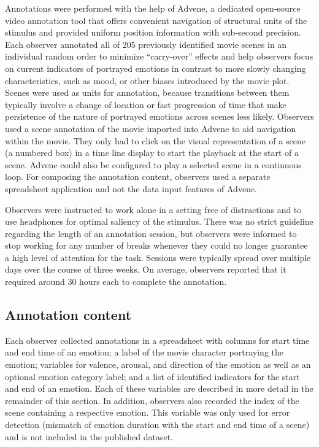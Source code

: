 \documentclass[10pt,a4paper,twocolumn]{article}
\begin{document}
Annotations were performed with the help of Advene\cite{AP2005}, a dedicated
open-source video annotation tool that offers convenient navigation of
structural units of the stimulus and provided uniform position information with
sub-second precision. Each observer annotated all of 205 previously identified
movie scenes in an individual random order to minimize ``carry-over'' effects
and help observers focus on current indicators of portrayed emotions in
contrast to more slowly changing characteristics, such as mood, or other biases
introduced by the movie plot. Scenes were used as units for annotation, because
transitions between them typically involve a change of location or fast
progression of time that make persistence of the nature of portrayed emotions
across scenes less likely. Observers used a scene annotation of the movie
imported into Advene to aid navigation within the movie. They only had to
click on the visual representation of a scene (a numbered box) in a time line
display to start the playback at the start of a scene. Advene could also be
configured to play a selected scene in a continuous loop. For composing the
annotation content, observers used a separate spreadsheet application and not
the data input features of Advene.

Observers were instructed to work alone in a setting free of distractions and
to use headphones for optimal saliency of the stimulus. There was no strict
guideline regarding the length of an annotation session, but observers were
informed to stop working for any number of breaks whenever they could no longer
guarantee a high level of attention for the task. Sessions were typically
spread over multiple days over the course of three weeks. On average, observers
reported that it required around 30 hours each to complete the annotation.

\subsection*{Annotation content}

Each observer collected annotations in a spreadsheet with columns
for start time and end time of an emotion; a label of the movie character
portraying the emotion; variables for valence, arousal, and direction of the
emotion as well as an optional emotion category label; and a list of
identified indicators for the start and end of an emotion. Each of these
variables are described in more detail in the remainder of this section. In
addition, observers also recorded the index of the scene containing a
respective emotion. This variable was only used for error detection (mismatch
of emotion duration with the start and end time of a scene) and is not included
in the published dataset.
\end{document}
